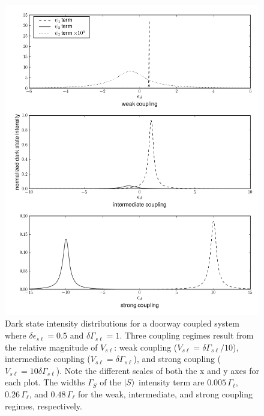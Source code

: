 \begin{figure}
  \caption{Dark state intensity distributions for a doorway coupled
    system where $\delta \epsilon_{s\ell} = 0.5$ and $\delta
    \Gamma_{s\ell} = 1$. Three coupling regimes result from the
    relative magnitude of $V_{s\ell}$: weak coupling ($V_{s\ell} =
    \delta \Gamma_{s\ell} / 10$), intermediate coupling ($V_{s\ell} =
    \delta \Gamma_{s\ell}$), and strong coupling ($V_{s\ell} = 10
    \delta \Gamma_{s\ell}$). Note the different scales of both the x
    and y axes for each plot. The widths $\Gamma_S$ of the $\mathinner{|{S}\rangle}$
    intensity term are $0.005 \, \Gamma_{\ell}$, $0.26 \,
    \Gamma_{\ell}$, and $0.48 \, \Gamma_{\ell}$ for the weak,
    intermediate, and strong coupling regimes, respectively.}
  \label{fig:complex-overlaps}
  \centering
  \includegraphics[width=6.4in]{complex-overlaps.png}
\end{figure}

